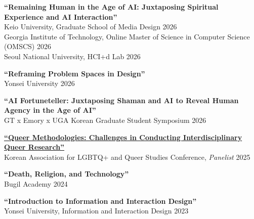 \noindent \textbf{``Remaining Human in the Age of AI: Juxtaposing Spiritual Experience and AI Interaction''}\\
Keio University, Graduate School of Media Design \hfill{2026}\\
Georgia Institute of Technology, Online Master of Science in Computer Science (OMSCS) \hfill{2026}\\
Seoul National University, HCI+d Lab \hfill{2026}\\

\vspace{-0.25cm}

\noindent \textbf{``Reframing Problem Spaces in Design''}\\
Yonsei University \hfill{2026}\\

\vspace{-0.25cm}

\noindent \textbf{``AI Fortuneteller: Juxtaposing Shaman and AI to Reveal Human Agency in the Age of AI''}\\
GT x Emory x UGA Korean Graduate Student Symposium \hfill{2026}\\

\vspace{-0.25cm}

\noindent \href{https://queerstudies.kr/lastissue/?q=YToxOntzOjEyOiJrZXl3b3JkX3R5cGUiO3M6MzoiYWxsIjt9&bmode=view&idx=167745464&t=board}{\textbf{``Queer Methodologies: Challenges in Conducting Interdisciplinary Queer Research''}}\\
Korean Association for LGBTQ+ and Queer Studies Conference, \textit{Panelist} \hfill{2025}\\

\vspace{-0.25cm}

\noindent \textbf{``Death, Religion, and Technology''}\\
Bugil Academy \hfill{2024}\\

\vspace{-0.25cm}

\noindent \textbf{``Introduction to Information and Interaction Design''}\\
Yonsei University, Information and Interaction Design \hfill{2023}\\

